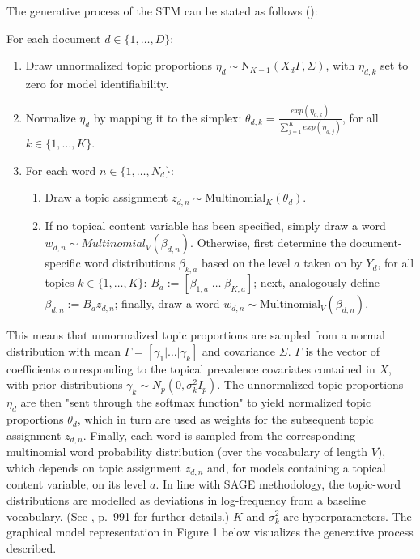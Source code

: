 \noindent
The generative process of the STM can be stated as follows (\citealp{roberts2016model}):

\vspace{0.25cm}
\noindent
For each document $d \in \{1,\dots,D\}$:

\begin{enumerate}[{1)}]
\vspace{-0.25cm}
\item Draw unnormalized topic proportions $\eta_d \sim \text{N}_{K-1}(X_d\Gamma, \Sigma)$, with $\eta_{d,k}$ set to zero for model identifiability.
\vspace{-0.25cm}
\item Normalize $\eta_d$ by mapping it to the simplex: $\theta_{d,k} = \frac{exp(\eta_{d,k})}{\sum_{j=1}^{K}exp(\eta_{d,j})}$, for all $k \in \{1,\dots,K\}$.
\vspace{-0.25cm}
\item For each word $n \in \{1,\dots,N_d\}$:
	\begin{enumerate}[{a)}]
	\vspace{-0.25cm}    
    \item Draw a topic assignment $z_{d,n} \sim \text{Multinomial}_K(\theta_d)$.
	\vspace{-0.25cm}    
    \item If no topical content variable has been specified, simply draw a word $w_{d,n} \sim Multinomial_V(\beta_{d,n})$. Otherwise, first determine the document-specific word distributions $\beta_{k,a}$ based on the level $a$ taken on by $Y_d$, for all topics $k \in \{1,\dots,K\}$: $B_a := [\beta_{1,a}|\dots|\beta_{K,a}]$; next, analogously define $\beta_{d,n}:=B_az_{d,n}$; finally, draw a word $w_{d,n} \sim \text{Multinomial}_V(\beta_{d,n})$.
	\end{enumerate}
\end{enumerate}

\noindent
This means that unnormalized topic proportions are sampled from a normal distribution with mean $\Gamma = [\gamma_1|\dots|\gamma_k]$ and covariance $\Sigma$. $\Gamma$ is the vector of coefficients corresponding to the topical prevalence covariates contained in $X$, with prior distributions $\gamma_k \sim N_p(0, \sigma_k^2I_p)$. The unnormalized topic proportions $\eta_d$ are then "sent through the softmax function" to yield normalized topic proportions $\theta_d$, which in turn are used as weights for the subsequent topic assignment $z_{d,n}$. Finally, each word is sampled from the corresponding multinomial word probability distribution (over the vocabulary of length $V$), which depends on topic assignment $z_{d,n}$ and, for models containing a topical content variable, on its level $a$. In line with SAGE methodology, the topic-word distributions are modelled as deviations in log-frequency from a baseline vocabulary. (See \cite{roberts2016model}, p.\ 991 for further details.) $K$ and $\sigma_k^2$ are hyperparameters. The graphical model representation in Figure 1 below visualizes the generative process described.


